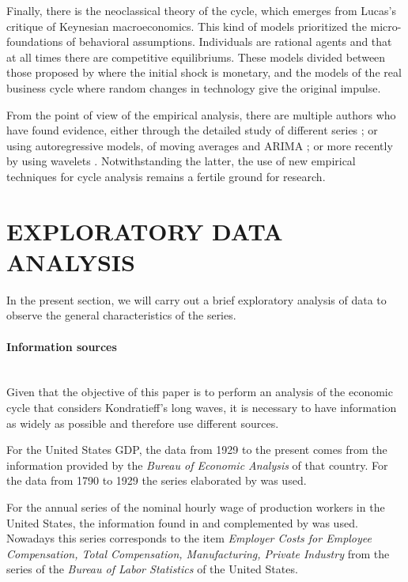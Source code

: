 \documentclass[a4paper,10cpi]{article}
\begin{document}
	Finally, there is the neoclassical theory of the cycle, which emerges from Lucas's critique of Keynesian macroeconomics. This kind of models prioritized the micro-foundations of behavioral assumptions. Individuals are rational agents and that at all times there are competitive equilibriums. These models divided between those proposed by \cite{lucas1975equilibrium} where the initial shock is monetary, and the models of the real business cycle \citep{plosser1989understanding} where random changes in technology give the original impulse.
	
	From the point of view of the empirical analysis, there are multiple authors who have found evidence, either through the detailed study of different series \citep{kuznets1930secular, kondratieff1979long, schumpeter1939business}; or using autoregressive models, of moving averages and ARIMA \citep {hamilton1989new, kaiser2012measuring}; or more recently by using wavelets \citep {yogo2008measuring, soares2011business}. Notwithstanding the latter, the use of new empirical techniques for cycle analysis remains a fertile ground for research.
	
	\section{\uppercase{\textbf{\normalsize{Exploratory Data Analysis}}}}\label{EDA}
	
	In the present section, we will carry out a brief exploratory analysis of data to observe the general characteristics of the series.
	
	\paragraph{Information sources}\mbox{} \\

	
	Given that the objective of this paper is to perform an analysis of the economic cycle that considers Kondratieff's long waves, it is necessary to have information as widely as possible and therefore use different sources.
	
	For the United States GDP, the data from 1929 to the present comes from the information provided by the \textit{Bureau of Economic Analysis} of that country. For the data from 1790 to 1929 the series elaborated by \cite{johnston2018us} was used.
	
	For the annual series of the nominal hourly wage of production workers in the United States, the information found in \cite{officer2009two} and complemented by \cite{Roesch2018} was used. Nowadays this series corresponds to the item \textit{Employer Costs for Employee Compensation, Total Compensation, Manufacturing, Private Industry} from the series of the \textit{Bureau of Labor Statistics} of the United States.
	
\end{document}
